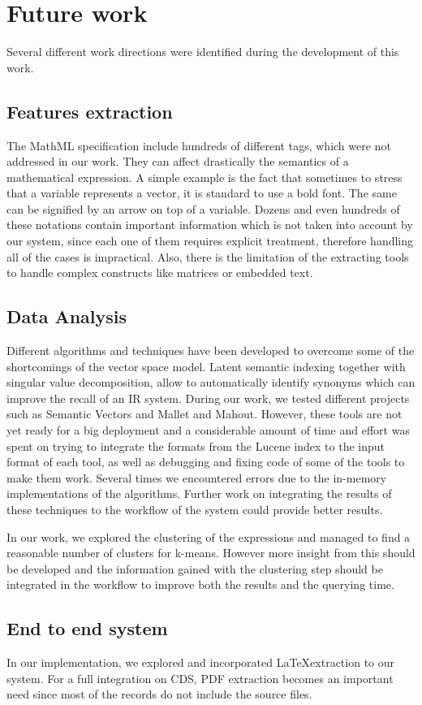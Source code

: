 \chapter{Future work}
\label{chap-future_work}

Several different work directions were identified during the development of this work. 

\section{Features extraction}
The MathML specification include hundreds of different tags, which were not addressed in our work. They can affect drastically the semantics of a mathematical expression. A simple example is the fact that sometimes to stress that a variable represents a vector, it is standard to use a bold font. The same can be signified by an arrow on top of a variable. Dozens and even hundreds of these notations contain important information which is not taken into account by our system, since each one of them requires explicit treatment, therefore handling all of the cases is impractical. Also, there is the limitation of the extracting tools to handle complex constructs like matrices or embedded text.

\section{Data Analysis}
Different algorithms and techniques have been developed to overcome some of the shortcomings of the vector space model. Latent semantic indexing together with singular value decomposition, allow to automatically identify synonyms which can improve the recall of an IR system. During our work, we tested different projects such as Semantic Vectors\cite{semantic_vectors} and Mallet\cite{mallet} and Mahout. However, these tools are not yet ready for a big deployment and a considerable amount of time and effort was spent on trying to integrate the formats from the Lucene index to the input format of each tool, as well as debugging and fixing code of some of the tools to make them work. Several times we encountered errors due to the in-memory implementations of the algorithms. Further work on integrating the results of these techniques to the workflow of the system could provide better results. 

In our work, we explored the clustering of the expressions and managed to find a reasonable number of clusters for k-means. However more insight from this should be developed and the information gained with the clustering step should be integrated in the workflow to improve both the results and the querying time. 

\section{End to end system}
In our implementation, we explored and incorporated \LaTeX extraction to our system. For a full integration on CDS, PDF extraction becomes an important need since most of the records do not include the source files. 
